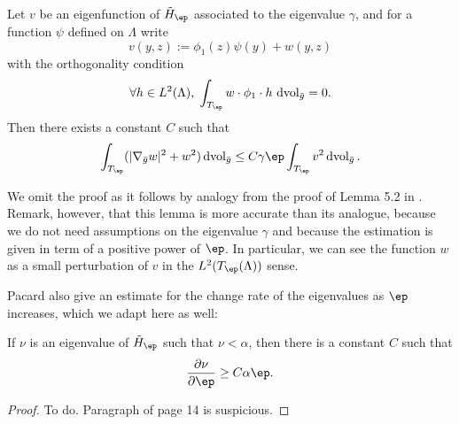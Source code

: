 \begin{lemma}
    Let $v$ be an eigenfunction of $\tilde H_\ep$ associated to the eigenvalue
    $\gamma$, and for a function $\psi$ defined on $\Lambda$ write
    \begin{equation}
        v(y,z):=\phi_1(z)\psi(y)+w(y,z)
    \end{equation}
    with the orthogonality condition
    \begin{equation}
        \forall h \in L^2(\Lambda),\; \int_{T_\ep}w\cdot \phi_1\cdot h\, \operatorname{dvol}_{\bar g} = 0.
    \end{equation}
    Then there exists a constant $C$ such that 
    \begin{equation}
        \int_{T_\ep}(|\nabla_{\bar g}w|^2+w^2)\operatorname{dvol}_{\bar g} \leq
        C\gamma\ep\int_{T_\ep} v^2\operatorname{dvol}_{\bar g}.
    \end{equation}
\end{lemma}
We omit the proof as it follows by analogy from the proof of Lemma 5.2 in
\cite{Pacard2014}. Remark, however, that this lemma is more accurate than its
analogue, because we do not need assumptions on the eigenvalue $\gamma$ and
because the estimation is given in term of a positive power of $\ep$. In
particular, we can see the function $w$ as a small perturbation of $v$ in the
$L^2(T_\ep(\Lambda))$ sense.
\medskip

Pacard \etal also give an estimate for the change rate of the eigenvalues as
$\ep$ increases, which we adapt here as well:

\begin{lemma}
    \label{lem-partial-nu}
    If $\nu$ is an eigenvalue of $\tilde H_\ep$ such that $\nu<\alpha$, then
    there is a constant $C$ such that
    $$\frac{\partial \nu}{\partial \ep} \geq C\alpha\ep.$$
\end{lemma}
\begin{proof}
    {\color{red} To do. Paragraph of page 14 is suspicious.}
\end{proof}
